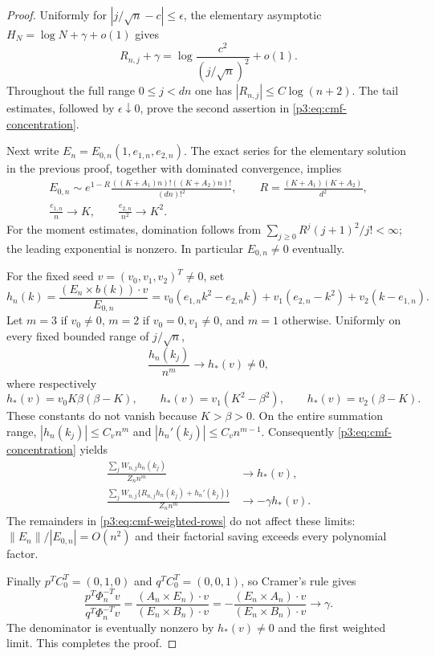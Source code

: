 \documentclass[11pt,a4paper]{article}
\theoremstyle{definition}
\theoremstyle{remark}
\numberwithin{equation}{section}
\begin{document}
\begin{proof}
Uniformly for $|j/\sqrt n-c|\leq\epsilon$, the elementary asymptotic
$H_N=\log N+\gamma+o(1)$ gives
\[
 R_{n,j}+\gamma
 =\log\frac{c^2}{(j/\sqrt n)^2}+o(1).
\]
Throughout the full range $0\leq j<dn$ one has
$|R_{n,j}|\leq C\log(n+2)$. The tail estimates, followed by
$\epsilon\downarrow0$, prove the second assertion in
\eqref{p3:eq:cmf-concentration}.

Next write $E_n=E_{0,n}(1,e_{1,n},e_{2,n})$. The exact series for the
elementary solution in the previous proof, together with dominated
convergence, implies
\begin{gather*}
 E_{0,n}\sim e^{1-R}\frac{((K+A_1)n)!((K+A_2)n)!}{(dn)!^2},
 \qquad R=\frac{(K+A_1)(K+A_2)}{d^2},\\
 \frac{e_{1,n}}n\longrightarrow K,
 \qquad \frac{e_{2,n}}{n^2}\longrightarrow K^2.
\end{gather*}
For the moment estimates, domination follows from
$\sum_{j\geq0}R^j(j+1)^2/j!<\infty$; the leading exponential is nonzero.
In particular $E_{0,n}\ne0$ eventually.

For the fixed seed $v=(v_0,v_1,v_2)^T\ne0$, set
\[
 h_n(k)=\frac{(E_n\times b(k))\cdot v}{E_{0,n}}
 =v_0(e_{1,n}k^2-e_{2,n}k)
       +v_1(e_{2,n}-k^2)+v_2(k-e_{1,n}).
\]
Let $m=3$ if $v_0\ne0$, $m=2$ if $v_0=0,v_1\ne0$, and $m=1$ otherwise.
Uniformly on every fixed bounded range of $j/\sqrt n$,
\[
 \frac{h_n(k_j)}{n^m}\longrightarrow h_*(v)\ne0,
\]
where respectively
\[
 h_*(v)=v_0K\beta(\beta-K),\qquad
 h_*(v)=v_1(K^2-\beta^2),\qquad
 h_*(v)=v_2(\beta-K).
\]
These constants do not vanish because $K>\beta>0$.
On the entire summation range, $|h_n(k_j)|\leq C_v n^m$ and
$|h_n'(k_j)|\leq C_v n^{m-1}$.
Consequently \eqref{p3:eq:cmf-concentration} yields
\begin{align*}
 \frac{\sum_j W_{n,j}h_n(k_j)}{Z_n n^m}&\longrightarrow h_*(v),\\
 \frac{\sum_j W_{n,j}\{R_{n,j}h_n(k_j)+h_n'(k_j)\}}
      {Z_n n^m}&\longrightarrow-\gamma h_*(v).
\end{align*}
The remainders in \eqref{p3:eq:cmf-weighted-rows} do not affect these limits:
$\|E_n\|/|E_{0,n}|=O(n^2)$ and their factorial saving exceeds every
polynomial factor.

Finally $p^TC_0^T=(0,1,0)$ and $q^TC_0^T=(0,0,1)$, so Cramer's rule gives
\[
 \frac{p^T\Phi_n^{-T}v}{q^T\Phi_n^{-T}v}
 =\frac{(A_n\times E_n)\cdot v}{(E_n\times B_n)\cdot v}
 =-\frac{(E_n\times A_n)\cdot v}{(E_n\times B_n)\cdot v}
 \longrightarrow\gamma.
\]
The denominator is eventually nonzero by $h_*(v)\ne0$ and the first
weighted limit. This completes the proof.
\end{proof}
\end{document}
